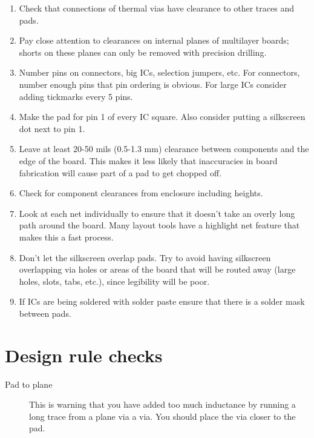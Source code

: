 \begin{enumerate}
\item Check that connections of thermal vias have clearance to other
  traces and pads.

\item Pay close attention to clearances on internal planes of
  multilayer boards; shorts on these planes can only be removed with
  precision drilling.
  
\item Number pins on connectors, big ICs, selection jumpers, etc. For
  connectors, number enough pins that pin ordering is obvious. For
  large ICs consider adding tickmarks every 5 pins.
  
\item Make the pad for pin 1 of every IC square. Also consider putting
  a silkscreen dot next to pin 1.

\item Leave at least 20-50 mils (0.5-1.3 mm) clearance between components and the edge of the board. This makes it less likely that inaccuracies in board fabrication will cause part of a pad to get chopped off.
  
\item Check for component clearances from enclosure including heights.
  
\item Look at each net individually to ensure that it doesn't take an
  overly long path around the board. Many layout tools have a
  highlight net feature that makes this a fast process.
  
\item Don't let the silkscreen overlap pads. Try to avoid having
  silkscreen overlapping via holes or areas of the board that will be
  routed away (large holes, slots, tabs, etc.), since legibility will
  be poor.
  
\item If ICs are being soldered with solder paste ensure that there is
  a solder mask between pads.
 \end{enumerate}



\section{Design rule checks}

\begin{description}
\item [Pad to plane] This is warning that you have added too much
  inductance by running a long trace from a plane via a via.  You
  should place the via closer to the pad.
\end{description}
